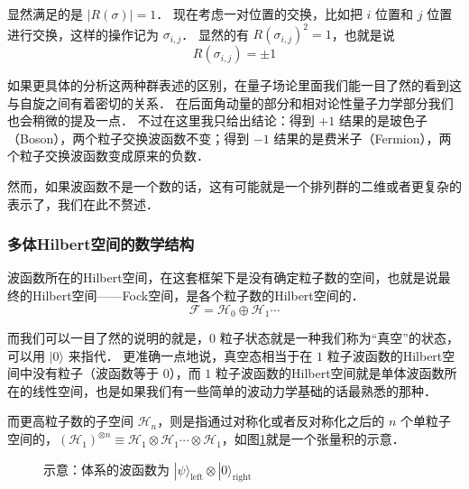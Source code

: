 显然满足的是 $|R(\sigma)| = 1$． 现在考虑一对位置的交换，比如把 $i$ 位置和 $j$ 位置进行交换，这样的操作记为 $\sigma_{i,j}$． 显然的有 $R(\sigma_{i,j})^2 = 1$，也就是说
\begin{equation}
R(\sigma_{i,j}) = \pm 1
\end{equation}

如果更具体的分析这两种群表述的区别，在量子场论里面我们能一目了然的看到这与自旋之间有着密切的关系． 在后面角动量的部分和相对论性量子力学部分我们也会稍微的提及一点． 不过在这里我只给出结论：得到 $+1$ 结果的是玻色子（Boson），两个粒子交换波函数不变；得到 $-1$ 结果的是费米子（Fermion），两个粒子交换波函数变成原来的负数．

然而，如果波函数不是一个数的话，这有可能就是一个排列群的二维或者更复杂的表示了，我们在此不赘述．

\subsubsection{多体Hilbert空间的数学结构}

波函数所在的Hilbert空间，在这套框架下是没有确定粒子数的空间，也就是说最终的Hilbert空间——Fock空间，是各个粒子数的Hilbert空间的．
\begin{equation}
\mathcal{F} = \mathcal{H}_0 \oplus \mathcal{H}_1\cdots
\end{equation}

而我们可以一目了然的说明的就是，$0$ 粒子状态就是一种我们称为“真空”的状态，可以用 $|0\rangle$ 来指代． 更准确一点地说，真空态相当于在 $1$ 粒子波函数的Hilbert空间中没有粒子（波函数等于 $0$），而 $1$ 粒子波函数的Hilbert空间就是单体波函数所在的线性空间，也是如果我们有一些简单的波动力学基础的话最熟悉的那种．

而更高粒子数的子空间 $\mathcal{H}_n$，则是指通过对称化或者反对称化之后的 $n$ 个单粒子空间的，$(\mathcal{H}_1)^{\otimes n} \equiv \mathcal{H}_1\otimes \mathcal{H}_1\cdots\otimes\mathcal{H}_1$，如图{\ref{Fig2.1}}就是一个张量积的示意．

\begin{figure}[h]
\centering
{}
\caption{示意：体系的波函数为 $|\psi\rangle_\text{left}\otimes|0\rangle_\text{right}$}\label{Fig2.1}
\end{figure}

